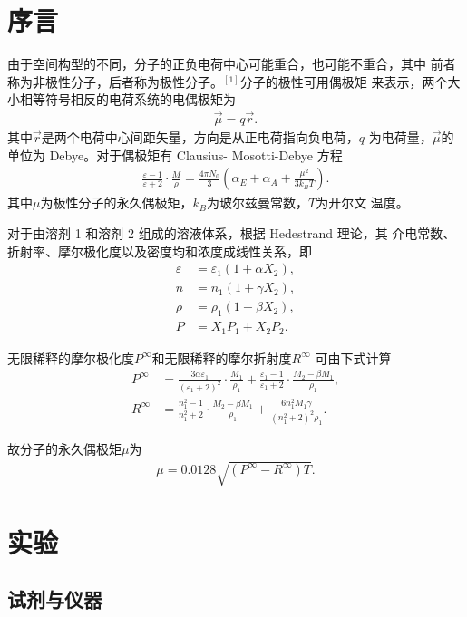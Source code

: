 \documentclass[12pt]{ctexart}
\numberwithin{equation}{section}
\begin{document}
\section{序言}

由于空间构型的不同，分子的正负电荷中心可能重合，也可能不重合，其中
前者称为非极性分子，后者称为极性分子。$^{[1]}$分子的极性可用偶极矩
来表示，两个大小相等符号相反的电荷系统的电偶极矩为
\begin{align}
    \vec{\mu} = q\vec{r}.
\end{align}
其中$\vec{r}$是两个电荷中心间距矢量，方向是从正电荷指向负电荷，$q$
为电荷量，$\vec{\mu}$的单位为 Debye。对于偶极矩有 Clausius-
Mosotti-Debye 方程
\begin{align}
    \frac{\varepsilon-1}{\varepsilon+2}\cdot\frac{M}{\rho}
    = \frac{4\pi N_0}{3}
    \left(\alpha_E + \alpha_A + \frac{\mu^2}{3k_BT}\right).
\end{align}
其中$\mu$为极性分子的永久偶极矩，$k_B$为玻尔兹曼常数，$T$为开尔文
温度。

对于由溶剂 1 和溶剂 2 组成的溶液体系，根据 Hedestrand 理论，其
介电常数、折射率、摩尔极化度以及密度均和浓度成线性关系，即
\begin{align}
    \varepsilon &= \varepsilon_1(1+\alpha X_2), \\
    n &= n_1(1+\gamma X_2), \\
    \rho &= \rho_1(1+\beta X_2), \\
    P &= X_1P_1 + X_2P_2.
\end{align}

无限稀释的摩尔极化度$P^\infty$和无限稀释的摩尔折射度$R^\infty$
可由下式计算
\begin{align}
    P^\infty &= \frac{3\alpha\varepsilon_1}
            {(\varepsilon_1 + 2)^2}\cdot\frac{M_1}{\rho_1}
        + \frac{\varepsilon_1 - 1}{\varepsilon_1 + 2}\cdot
            \frac{M_2 - \beta M_1}{\rho_1}, \\
    R^\infty &= \frac{n_1^2 - 1}{n_1^2 + 2}\cdot
            \frac{M_2 - \beta M_1}{\rho_1}
        + \frac{6n_1^2 M_1 \gamma}{(n_1^2 + 2)^2\rho_1}.
\end{align}

故分子的永久偶极矩$\mu$为
\begin{align}
    \mu = 0.0128\sqrt{(P^\infty - R^\infty)T}.
\end{align}

\section{实验}
\subsection{试剂与仪器}
\end{document}
